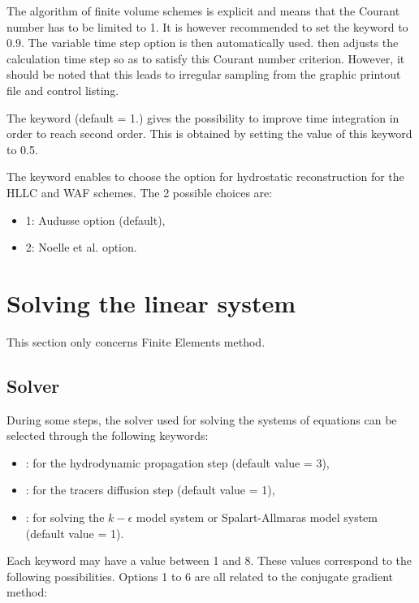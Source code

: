The algorithm of finite volume schemes is explicit and means that
the Courant number has to be limited to 1.
It is however recommended to set the keyword 
to 0.9.
The variable time step option is then automatically used.
 then adjusts the calculation time step so as to satisfy
this Courant number criterion.
However, it should be noted that this leads to irregular sampling
from the graphic printout file and control listing.

The keyword  (default = 1.) gives
the possibility to improve time integration in order to reach second order.
This is obtained by setting the value of this keyword to 0.5.

The keyword 
enables to choose the option for hydrostatic reconstruction for the
HLLC and WAF schemes.
The 2 possible choices are:
\begin{itemize}
\item 1: Audusse option (default),
\item 2: Noelle et al. option.
\end{itemize}


\section{Solving the linear system}

This section only concerns Finite Elements method.
\subsection{Solver}

During some steps, the solver used for solving the systems of equations
can be selected through the following keywords:

\begin{itemize}
\item {}: for the hydrodynamic propagation step
(default value = 3),

\item {}: for the tracers diffusion step
(default value = 1),

\item {}:
for solving the $k-\epsilon$ model system or Spalart-Allmaras model system
(default value = 1).
\end{itemize}

Each keyword may have a value between 1 and 8.
These values correspond to the following possibilities.
Options 1 to 6 are all related to the conjugate gradient method:

